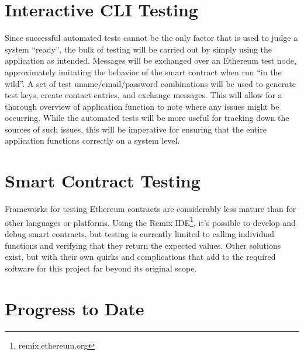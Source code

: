 \documentclass[titlepage]{report}
\begin{document}
\section{Interactive CLI Testing}
Since successful automated tests cannot be the only factor that is used to judge a system ``ready'', the bulk of testing will be carried out by simply using the application as intended. Messages will be exchanged over an \gls{Ethereum} test node, approximately imitating the behavior of the \gls{smart contract} when run ``in the wild''. A set of test uname/email/password combinations will be used to generate test keys, create contact entries, and exchange messages. This will allow for a thorough overview of application function to note where any issues might be occurring. While the automated tests will be more useful for tracking down the sources of such issues, this will be imperative for ensuring that the entire application functions correctly on a system level.

\section{Smart Contract Testing}
Frameworks for testing \gls{Ethereum} contracts are considerably less mature than for other languages or platforms. Using the Remix IDE\footnote{remix.ethereum.org}, it's possible to develop and debug \glspl{smart contract}, but testing is currently limited to calling individual functions and verifying that they return the expected values. Other solutions exist, but with their own quirks and complications that add to the required software for this project far beyond its original scope.

\pagebreak

\section{Progress to Date}
\end{document}
